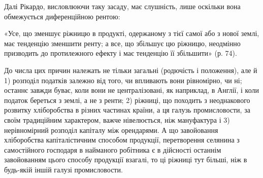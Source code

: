 Далі Рікардо, висловлюючи таку засаду, має слушність, лише оскільки вона
обмежується диференційною рентою:

«Усе, що зменшує ріжницю в продукті, одержаному з тієї самої або з
нової землі, має тенденцію зменшити ренту; а все, що збільшує цю ріжницю,
неодмінно призводить до протилежного ефекту і має тенденцію її збільшити»
(р. 74).

До числа цих причин належать не тільки загальні (родючість і положення),
але й 1) розподіл податків залежно від того, чи впливають вони
рівномірно, чи ні; останнє завжди буває, коли вони не централізовані, як наприклад,
в Англії, і коли податок береться з землі, а не з ренти; 2) ріжниці,
що походить з неоднакового розвитку хліборобства в різних частинах країни,
а ця галузь промисловости, за своїм традиційним характером, важче нівелюється,
ніж мануфактура і 3) нерівномірний розподіл капіталу між орендарями.
А що завойовання хліборобства капіталістичним способом продукції, перетворення
селянина з самостійного господаря в найманого робітника є в дійсності останнім
завойованням цього способу продукції взагалі, то ці ріжниці тут більші,
ніж в будь-якій іншій галузі промисловости.
